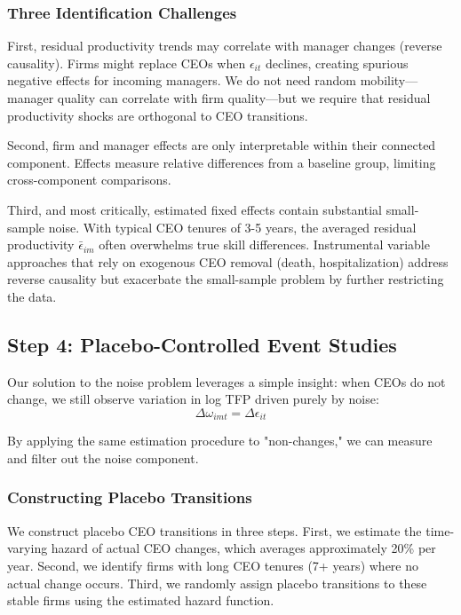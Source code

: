 \documentclass[11pt,a4paper]{article}
\begin{document}
\subsubsection{Three Identification Challenges}

First, residual productivity trends may correlate with manager changes (reverse causality). Firms might replace CEOs when $\epsilon_{it}$ declines, creating spurious negative effects for incoming managers. We do not need random mobility—manager quality can correlate with firm quality—but we require that residual productivity shocks are orthogonal to CEO transitions.

Second, firm and manager effects are only interpretable within their connected component. Effects measure relative differences from a baseline group, limiting cross-component comparisons.

Third, and most critically, estimated fixed effects contain substantial small-sample noise. With typical CEO tenures of 3-5 years, the averaged residual productivity $\bar{\epsilon}_{im}$ often overwhelms true skill differences. Instrumental variable approaches that rely on exogenous CEO removal (death, hospitalization) address reverse causality but exacerbate the small-sample problem by further restricting the data.

\subsection{Step 4: Placebo-Controlled Event Studies}

Our solution to the noise problem leverages a simple insight: when CEOs do not change, we still observe variation in log TFP driven purely by noise:
\begin{equation}
\Delta\omega_{imt} = \Delta\epsilon_{it}
\end{equation}

By applying the same estimation procedure to "non-changes," we can measure and filter out the noise component.

\subsubsection{Constructing Placebo Transitions}

We construct placebo CEO transitions in three steps. First, we estimate the time-varying hazard of actual CEO changes, which averages approximately 20\% per year. Second, we identify firms with long CEO tenures (7+ years) where no actual change occurs. Third, we randomly assign placebo transitions to these stable firms using the estimated hazard function.
\end{document}
